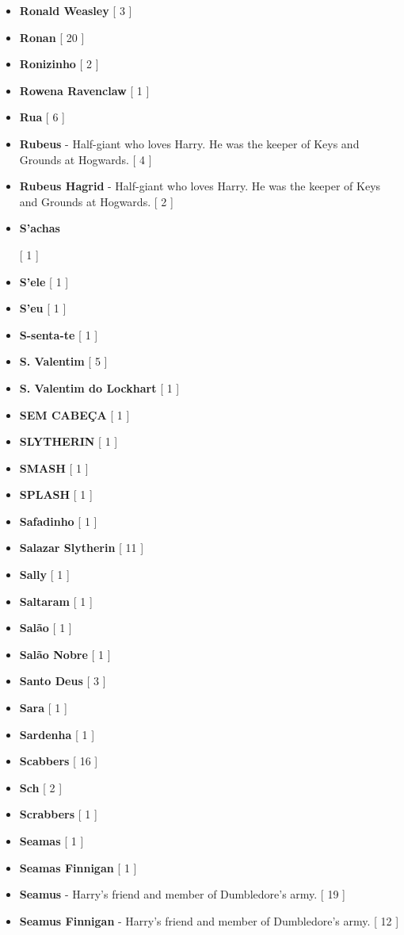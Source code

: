 \documentclass[a4paper]{article}
\begin{document}
{\begin{itemize}
	\item \textbf{Ronald Weasley} [ 3 ]
	\item \textbf{Ronan} [ 20 ]
	\item \textbf{Ronizinho} [ 2 ]
	\item \textbf{Rowena Ravenclaw} [ 1 ]
	\item \textbf{Rua} [ 6 ]
	\item \textbf{Rubeus} - Half-giant who loves Harry. He was the keeper of Keys and Grounds at Hogwards. [ 4 ]
	\item \textbf{Rubeus Hagrid} - Half-giant who loves Harry. He was the keeper of Keys and Grounds at Hogwards. [ 2 ]
	\item \hypertarget{S}{\textbf{S'achas}} [ 1 ]
	\item \textbf{S'ele} [ 1 ]
	\item \textbf{S'eu} [ 1 ]
	\item \textbf{S-senta-te} [ 1 ]
	\item \textbf{S. Valentim} [ 5 ]
	\item \textbf{S. Valentim do Lockhart} [ 1 ]
	\item \textbf{SEM CABEÇA} [ 1 ]
	\item \textbf{SLYTHERIN} [ 1 ]
	\item \textbf{SMASH} [ 1 ]
	\item \textbf{SPLASH} [ 1 ]
	\item \textbf{Safadinho} [ 1 ]
	\item \textbf{Salazar Slytherin} [ 11 ]
	\item \textbf{Sally} [ 1 ]
	\item \textbf{Saltaram} [ 1 ]
	\item \textbf{Salão} [ 1 ]
	\item \textbf{Salão Nobre} [ 1 ]
	\item \textbf{Santo Deus} [ 3 ]
	\item \textbf{Sara} [ 1 ]
	\item \textbf{Sardenha} [ 1 ]
	\item \textbf{Scabbers} [ 16 ]
	\item \textbf{Sch} [ 2 ]
	\item \textbf{Scrabbers} [ 1 ]
	\item \textbf{Seamas} [ 1 ]
	\item \textbf{Seamas Finnigan} [ 1 ]
	\item \textbf{Seamus} - Harry's friend and member of Dumbledore's army. [ 19 ]
	\item \textbf{Seamus Finnigan} - Harry's friend and member of Dumbledore's army. [ 12 ]

\end{itemize}}
\end{document}
